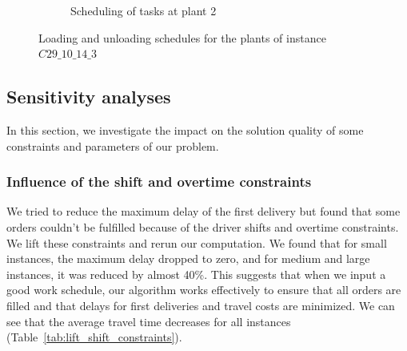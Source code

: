 \documentclass{article}
\begin{document}
\begin{figure}[htb]
\begin{subfigure}{\textwidth}
        \vspace*{-3em}
        \caption{Scheduling of tasks at plant  2}
        \label{fig:plant2}
    \end{subfigure}

    \caption{Loading and unloading schedules for the plants of instance $C29\_10\_14\_3$}
    \label{fig:plants_schedules}
\end{figure}

\subsection{Sensitivity analyses}

In this section, we investigate the impact on the solution quality of some constraints and parameters of our problem. 

\subsubsection{Influence of the shift and overtime constraints}

We tried to reduce the maximum delay of the first delivery but found that some orders couldn't be fulfilled because of the driver shifts and overtime constraints. We lift  these constraints and rerun our computation. We found that for small instances, the maximum delay dropped to zero, and for medium and large instances, it was reduced by almost 40\%. This suggests that when we input a good work schedule, our algorithm works effectively to ensure that all orders are filled and that delays for first deliveries and travel costs are minimized. We can see that the average travel time decreases for all instances (Table~\ref*{tab:lift_shift_constraints}).%

\end{document}
